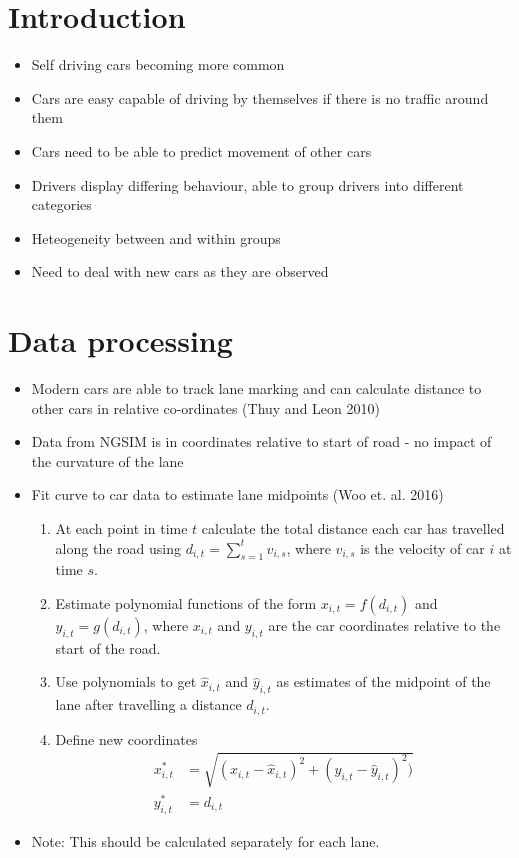 \documentclass[12pt,a4paper]{article}\usepackage[]{graphicx}\usepackage[]{color}
\begin{document}
\section{Introduction}

\begin{itemize}
\item Self driving cars becoming more common
\item Cars are easy capable of driving by themselves if there is no traffic around them
\item Cars need to be able to predict movement of other cars
\item Drivers display differing behaviour, able to group drivers into different categories
\item Heteogeneity between and within groups
\item Need to deal with new cars as they are observed
\end{itemize}

\section{Data processing}

\begin{itemize}
\item Modern cars are able to track lane marking and can calculate distance to other cars in relative co-ordinates (Thuy and Leon 2010)
\item Data from NGSIM is in coordinates relative to start of road - no impact of the curvature of the lane
\item Fit curve to car data to estimate lane midpoints (Woo et. al. 2016) 
\begin{enumerate}
\item At each point in time $t$ calculate the total distance each car has travelled along the road using $d_{i, t} = \sum_{s=1}^t v_{i, s}$, where $v_{i, s}$ is the velocity of car $i$ at time $s$. 
\item Estimate polynomial functions of the form $x_{i, t} = f(d_{i, t})$ and $y_{i, t} = g(d_{i, t})$, where $x_{i, t}$ and $y_{i, t}$ are the car coordinates relative to the start of the road.
\item Use polynomials to get $\hat{x}_{i, t}$ and $\hat{y}_{i, t}$ as estimates of the midpoint of the lane after travelling a distance $d_{i, t}$.
\item Define new coordinates 
\begin{align}
x^*_{i, t} &= \sqrt{(x_{i, t}-\hat{x}_{i, t})^2 + (y_{i, t} - \hat{y}_{i, t})^2)} \label{xRel} \\
y^*_{i, t} &= d_{i, t} \label{yRel}
\end{align}
\end{enumerate}
\item Note: This should be calculated separately for each lane.
\end{itemize}
\end{document}
